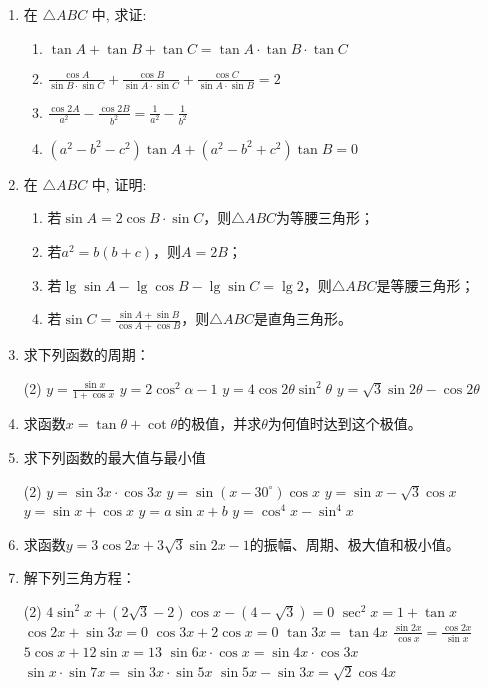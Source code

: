 \begin{enumerate}
\item 在 $\triangle A B C$ 中, 求证:
\begin{enumerate}
    \item $\tan  A+\tan  B+\tan  C=\tan  A \cdot \tan  B \cdot \tan  C$
    \item $\frac{\cos A}{\sin B \cdot \sin C}+\frac{\cos B}{\sin A \cdot \sin C}+\frac{\cos C}{\sin A \cdot \sin B}=2$
    \item $\frac{\cos 2 A}{a^{2}}-\frac{\cos 2 B}{b^{2}}=\frac{1}{a^{2}}-\frac{1}{b^{2}}$
    \item $\left(a^{2}-b^{2}-c^{2}\right) \tan  A+\left(a^{2}-b^{2}+c^{2}\right) \tan  B=0$
\end{enumerate}


\item 在 $\triangle A B C$ 中, 证明:
\begin{enumerate}
    \item 若$\sin A=2\cos B\cdot \sin C$，则$\triangle A B C$为等腰三角形；
    \item 若$a^2=b(b+c)$，则$A=2B$；
    \item 若$\lg\sin A-\lg\cos B-\lg\sin C=\lg2$，则$\triangle A B C$是等腰三角形；
    \item 若$\sin C=\frac{\sin A+\sin B}{\cos A+\cos B}$，则$\triangle A B C$是直角三角形。
\end{enumerate}
\item 求下列函数的周期：
\begin{tasks}(2)
    \task $y=\frac{\sin x}{1+\cos x}$
    \task $y=2 \cos ^{2} \alpha-1$
    \task $y=4 \cos 2 \theta \sin ^{2} \theta$
    \task $y=\sqrt{3} \sin 2 \theta-\cos 2 \theta$
\end{tasks}    

\item 求函数$x=\tan\theta+\cot\theta$的极值，并求$\theta$为何值时达到这个极值。
\item 求下列函数的最大值与最小值
\begin{tasks}(2)
\task $y=\sin 3 x \cdot \cos 3 x$
\task $y=\sin \left(x-30^{\circ}\right) \cos x$
\task $y=\sin x-\sqrt{3} \cos x$
\task $y=\sin x+\cos x$
\task $y=a \sin x+b$
\task $y=\cos ^{4} x-\sin ^{4} x$
\end{tasks}    


\item 求函数$y=3\cos 2x+3\sqrt{3}\sin 2x-1$的振幅、周期、极大值和极小值。
\item 解下列三角方程：
 \begin{tasks}(2)
\task $4\sin ^{2} x+(2 \sqrt{3}-2) \cos x-(4-\sqrt{3})=0$
\task $\sec ^{2} x=1+\tan x$
\task  $\cos 2 x+\sin 3 x=0$
\task $\cos 3 x+2 \cos x=0$
\task $\tan 3 x=\tan 4 x$
\task $\frac{\sin 2 x}{\cos x}=\frac{\cos 2x}{\sin x}$
\task $5 \cos x+12 \sin x=13$
\task  $\sin 6 x \cdot \cos x=\sin 4 x \cdot \cos 3 x$
\task $\sin x \cdot \sin 7 x=\sin 3 x \cdot \sin 5 x$
\task $\sin 5x-\sin 3x=\sqrt{2}\cos 4x$
\end{tasks}   


\end{enumerate}
